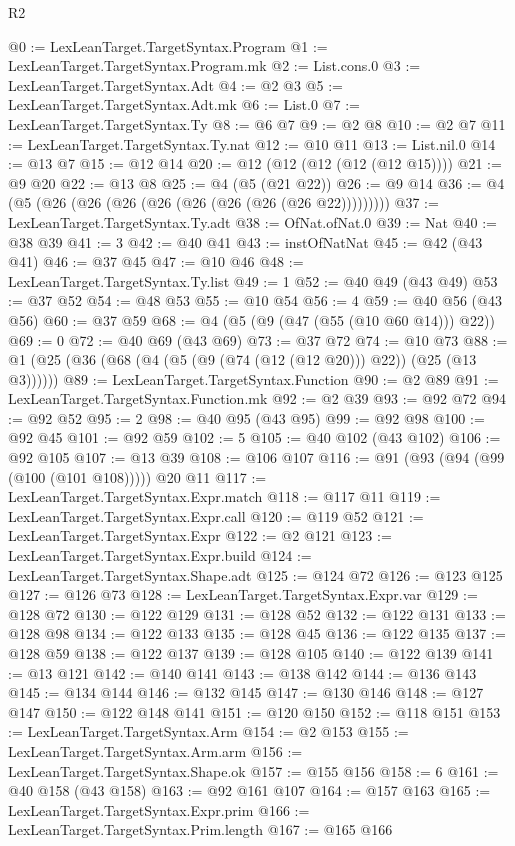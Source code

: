 \begin{lexlean}{R2}
\begin{coremodule}
{{{{{{{{{{{{{{{{{{{{{{{{{{{{{{{{{{{{{{{{{{{{{{{{{{{{{{{{{{{{{{{{{{{{{{{{{{{{{{{{{{{{{{{{{{{{@0 := LexLeanTarget.TargetSyntax.Program
@1 := LexLeanTarget.TargetSyntax.Program.mk
@2 := List.cons.{0}
@3 := LexLeanTarget.TargetSyntax.Adt
@4 := @2 @3
@5 := LexLeanTarget.TargetSyntax.Adt.mk
@6 := List.{0}
@7 := LexLeanTarget.TargetSyntax.Ty
@8 := @6 @7
@9 := @2 @8
@10 := @2 @7
@11 := LexLeanTarget.TargetSyntax.Ty.nat
@12 := @10 @11
@13 := List.nil.{0}
@14 := @13 @7
@15 := @12 @14
@20 := @12 (@12 (@12 (@12 (@12 @15))))
@21 := @9 @20
@22 := @13 @8
@25 := @4 (@5 (@21 @22))
@26 := @9 @14
@36 := @4 (@5 (@26 (@26 (@26 (@26 (@26 (@26 (@26 (@26 @22)))))))))
@37 := LexLeanTarget.TargetSyntax.Ty.adt
@38 := OfNat.ofNat.{0}
@39 := Nat
@40 := @38 @39
@41 := 3
@42 := @40 @41
@43 := instOfNatNat
@45 := @42 (@43 @41)
@46 := @37 @45
@47 := @10 @46
@48 := LexLeanTarget.TargetSyntax.Ty.list
@49 := 1
@52 := @40 @49 (@43 @49)
@53 := @37 @52
@54 := @48 @53
@55 := @10 @54
@56 := 4
@59 := @40 @56 (@43 @56)
@60 := @37 @59
@68 := @4 (@5 (@9 (@47 (@55 (@10 @60 @14))) @22))
@69 := 0
@72 := @40 @69 (@43 @69)
@73 := @37 @72
@74 := @10 @73
@88 := @1 (@25 (@36 (@68 (@4 (@5 (@9 (@74 (@12 (@12 @20))) @22)) (@25 (@13 @3))))))
@89 := LexLeanTarget.TargetSyntax.Function
@90 := @2 @89
@91 := LexLeanTarget.TargetSyntax.Function.mk
@92 := @2 @39
@93 := @92 @72
@94 := @92 @52
@95 := 2
@98 := @40 @95 (@43 @95)
@99 := @92 @98
@100 := @92 @45
@101 := @92 @59
@102 := 5
@105 := @40 @102 (@43 @102)
@106 := @92 @105
@107 := @13 @39
@108 := @106 @107
@116 := @91 (@93 (@94 (@99 (@100 (@101 @108))))) @20 @11
@117 := LexLeanTarget.TargetSyntax.Expr.match
@118 := @117 @11
@119 := LexLeanTarget.TargetSyntax.Expr.call
@120 := @119 @52
@121 := LexLeanTarget.TargetSyntax.Expr
@122 := @2 @121
@123 := LexLeanTarget.TargetSyntax.Expr.build
@124 := LexLeanTarget.TargetSyntax.Shape.adt
@125 := @124 @72
@126 := @123 @125
@127 := @126 @73
@128 := LexLeanTarget.TargetSyntax.Expr.var
@129 := @128 @72
@130 := @122 @129
@131 := @128 @52
@132 := @122 @131
@133 := @128 @98
@134 := @122 @133
@135 := @128 @45
@136 := @122 @135
@137 := @128 @59
@138 := @122 @137
@139 := @128 @105
@140 := @122 @139
@141 := @13 @121
@142 := @140 @141
@143 := @138 @142
@144 := @136 @143
@145 := @134 @144
@146 := @132 @145
@147 := @130 @146
@148 := @127 @147
@150 := @122 @148 @141
@151 := @120 @150
@152 := @118 @151
@153 := LexLeanTarget.TargetSyntax.Arm
@154 := @2 @153
@155 := LexLeanTarget.TargetSyntax.Arm.arm
@156 := LexLeanTarget.TargetSyntax.Shape.ok
@157 := @155 @156
@158 := 6
@161 := @40 @158 (@43 @158)
@163 := @92 @161 @107
@164 := @157 @163
@165 := LexLeanTarget.TargetSyntax.Expr.prim
@166 := LexLeanTarget.TargetSyntax.Prim.length
@167 := @165 @166
}}}}}}}}}}}}}}}}}}}}}}}}}}}}}}}}}}}}}}}}}}}}}}}}}}}}}}}}}}}}}}}}}}}}}}}}}}}}}}}}}}}}}}}}}}}}
\end{coremodule}
\end{lexlean}
